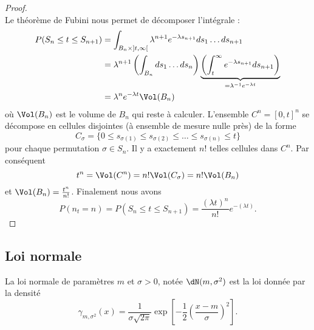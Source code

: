 \begin{proof}
\begin{equation}
\end{equation}
Le théorème de Fubini nous permet de décomposer l'intégrale :
\begin{subequations}
    \begin{align}
        P(S_n\leq t\leq S_{n+1})&=\int_{B_n\times\mathopen] t , \infty \mathclose[}\lambda^{n+1} e^{-\lambda s_{n+1}}ds_1\ldots ds_{n+1}\\
        &=\lambda^{n+1}\left( \int_{B_n}ds_1\ldots ds_n \right)\underbrace{\left( \int_t^{\infty} e^{-\lambda s_{n+1}}ds_{n+1} \right)}_{=\lambda^{-1} e^{-\lambda t}}\\
        &=\lambda^n e^{-\lambda t}\Vol(B_n)
    \end{align}
\end{subequations}
où \( \Vol(B_n)\) est le volume de \( B_n\) qui reste à calculer. L'ensemble \( C^n=[0,t]^n\) se décompose en cellules disjointes (à ensemble de mesure nulle près) de la forme
\begin{equation}
    C_{\sigma}=\{ 0\leq s_{\sigma(1)}\leq s_{\sigma(2)}\leq\ldots\leq s_{\sigma(n)}\leq t \}
\end{equation}
pour chaque permutation \( \sigma\in S_n\). Il y a exactement \( n!\) telles cellules dans \( C^n\). Par conséquent
\begin{equation}
    t^n=\Vol(C^n)=n!\Vol(C_{\sigma})=n!\Vol(B_n)
\end{equation}
et \( \Vol(B_n)=\frac{ t^n }{ n! }\). Finalement nous avons
\begin{equation}
    P(n_t=n)=P(S_n\leq t\leq S_{n+1})=\frac{ (\lambda t)^n }{ n! } e^{-(\lambda t)}.
\end{equation}
    
\end{proof}
\subsection{Loi normale}

La loi normale de paramètres \( m\) et \( \sigma>0\), notée \( \dN(m,\sigma^2)\) est la loi donnée par la densité
\begin{equation}
    \gamma_{m,\sigma^2}(x)=\frac{1}{ \sigma\sqrt{2\pi} }\exp\left[ -\frac{ 1 }{2}\left( \frac{ x-m }{ \sigma } \right)^2 \right].
\end{equation}

